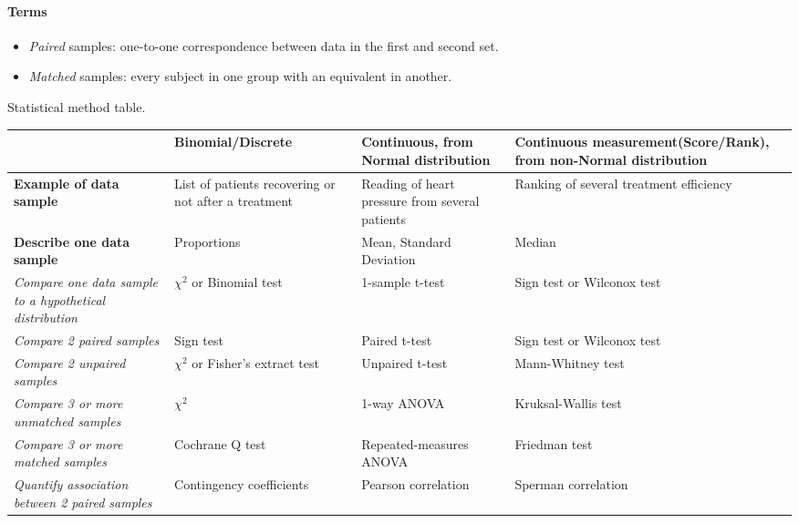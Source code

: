 \paragraph{Terms}
\begin{itemize}
    \item \emph{Paired} samples: one-to-one correspondence between data in the first and
        second set.
    \item \emph{Matched} samples: every subject in one group with an equivalent in 
        another.
\end{itemize}


\label{statistical_method_table}{Statistical method table.}\\ 
\begin{tabular}{|*{4}{b{4cm}|}}
\hline
& \textbf{Binomial/Discrete} & \textbf{Continuous, from Normal distribution} & 
\textbf{Continuous measurement\newline (Score/Rank), from non-Normal distribution} \\
\hline
    \textbf{Example of data sample} & List of patients recovering or not after a 
    treatment & Reading of heart pressure from several patients & Ranking of several
    treatment efficiency\\
\hline
    \textbf{Describe one data sample} & Proportions & Mean, Standard Deviation & Median \\
    \hline
    \emph{Compare one data sample to a hypothetical distribution} & $\chi^{2}$ or \label{binomial_test}{Binomial test} & 1-sample t-test & Sign test or Wilconox test \\
    \hline
    \emph{Compare 2 paired samples} & Sign test & Paired t-test & Sign test or Wilconox test \\
    \hline
    \emph{Compare 2 unpaired samples} & $\chi^{2}$ or Fisher's extract test & Unpaired t-test & Mann-Whitney test \\
    \hline
    \emph{Compare 3 or more unmatched samples} & $\chi^{2}$ & 1-way ANOVA & Kruksal-Wallis test \\
    \hline
    \emph{Compare 3 or more matched samples} & Cochrane Q test & Repeated-measures ANOVA & Friedman test\\
    \hline
    \emph{Quantify association between 2 paired samples} & Contingency coefficients & Pearson correlation & Sperman correlation \\
    \hline
\end{tabular}

